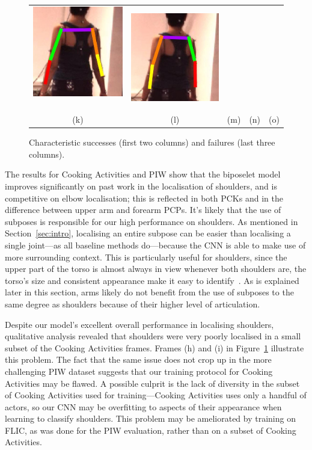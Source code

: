 \documentclass[runningheads]{llncs}
\begin{document}
\begin{figure}[t]
\begin{center}
\begin{tabular}{@{}c@{}c c@{}c@{}c@{}}
\includegraphics[width=0.17\linewidth]{figures/shots-cropped/h36m-s24f12-bad-flip-1.jpg}\,&
\includegraphics[width=0.17\linewidth]{figures/shots-cropped/h36m-s24f14-bad-flip-2.jpg}\\
(k) & (l) & (m) & (n) & (o)
\end{tabular}
\end{center}
\vspace{-6mm}
\caption{Characteristic successes (first two columns) and failures (last three
columns).}
\label{fig:qualitative}
\end{figure}

The results for Cooking Activities and PIW show that the biposelet model
improves significantly on past work in the localisation of shoulders, and is
competitive on elbow localisation; this is reflected in both PCKs and in the
difference between upper arm and forearm PCPs. It's likely that the use of
subposes is responsible for our high performance on shoulders. As mentioned in
Section~\ref{sec:intro}, localising an entire subpose can be easier than
localising a single joint---as all baseline methods do---because the CNN is able
to make use of more surrounding context. This is particularly useful for
shoulders, since the upper part of the torso is almost always in view whenever
both shoulders are, the torso's size and consistent appearance make it easy to
identify~\cite{mori2004recovering}. As is explained later in this section, arms
likely do not benefit from the use of subposes to the same degree as shoulders
because of their higher level of articulation.

Despite our model's excellent overall performance in localising shoulders,
qualitative analysis revealed that shoulders were very poorly localised in a
small subset of the Cooking Activities frames. Frames (h) and (i) in
Figure~\ref{fig:qualitative} illustrate this problem. The fact that the same
issue does not crop up in the more challenging PIW dataset suggests that our
training protocol for Cooking Activities may be flawed. A possible culprit is
the lack of diversity in the subset of Cooking Activities used for
training---Cooking Activities uses only a handful of actors, so our CNN may be
overfitting to aspects of their appearance when learning to classify shoulders.
This problem may be ameliorated by training on FLIC, as was done for the PIW
evaluation, rather than on a subset of Cooking Activities.
\end{document}
